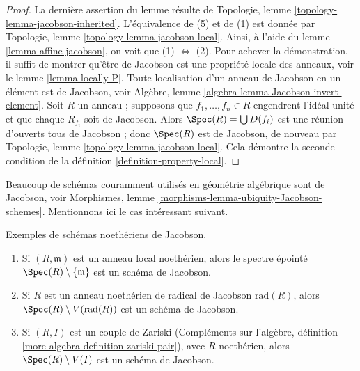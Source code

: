 \begin{proof}
La dernière assertion du lemme résulte de
Topologie, lemme \ref{topology-lemma-jacobson-inherited}.
L'équivalence de (5) et de (1) est donnée
par Topologie, lemme \ref{topology-lemma-jacobson-local}.
Ainsi, à l'aide du lemme \ref{lemma-affine-jacobson},
on voit que (1) $\Leftrightarrow$ (2).
Pour achever la démonstration, il suffit de montrer qu'être de Jacobson est
une propriété locale des anneaux, voir le lemme \ref{lemma-locally-P}.
Toute localisation d'un anneau de Jacobson en un élément est de Jacobson,
voir Algèbre, lemme \ref{algebra-lemma-Jacobson-invert-element}.
Soit $R$ un anneau ; supposons que $f_1, \ldots, f_n \in R$ engendrent l'idéal
unité et que chaque $R_{f_i}$ soit de Jacobson. Alors
$\Spec(R) = \bigcup D(f_i)$ est une réunion
d'ouverts tous de Jacobson ; donc $\Spec(R)$ est de Jacobson,
de nouveau par Topologie, lemme \ref{topology-lemma-jacobson-local}. Cela
démontre la seconde condition de la définition \ref{definition-property-local}.
\end{proof}

\noindent
Beaucoup de schémas couramment utilisés en géométrie algébrique sont de Jacobson,
voir Morphismes, lemme \ref{morphisms-lemma-ubiquity-Jacobson-schemes}.
Mentionnons ici le cas intéressant suivant.

\begin{lemma}
\label{lemma-complement-closed-point-Jacobson}
Exemples de schémas noethériens de Jacobson.
\begin{enumerate}
\item Si $(R, \mathfrak m)$ est un anneau local noethérien,
alors le spectre épointé $\Spec(R) \setminus \{\mathfrak m\}$
est un schéma de Jacobson.
\item Si $R$ est un anneau noethérien de radical de Jacobson $\text{rad}(R)$,
alors $\Spec(R) \setminus V(\text{rad}(R))$ est un schéma de Jacobson.
\item Si $(R, I)$ est un couple de Zariski (Compléments sur l'algèbre, définition
\ref{more-algebra-definition-zariski-pair}),
avec $R$ noethérien, alors $\Spec(R) \setminus V(I)$ est
un schéma de Jacobson.
\end{enumerate}
\end{lemma}

